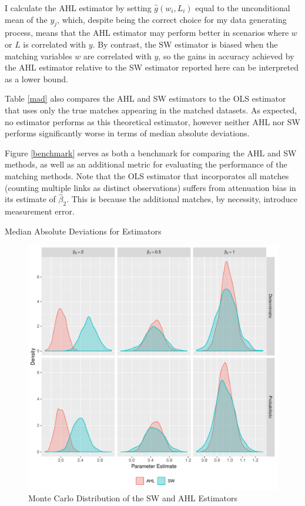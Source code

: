 \documentclass[12pt]{article}
\begin{document}
I calculate the AHL estimator by setting $\hat{g}(w_i, L_i)$ equal to the unconditional mean of the $y_j$, which, despite being the correct choice for my data generating process, means that the AHL estimator may perform better in scenarios where $w$ or $L$ is correlated with $y$.  By contrast, the SW estimator is biased when the matching variables $w$ are correlated with $y$, so the gains in accuracy achieved by the AHL estimator relative to the SW estimator reported here can be interpreted as a lower bound.  

Table \ref{mad} also compares the AHL and SW estimators to the OLS estimator that uses only the true matches appearing in the matched datasets.  As expected, no estimator performs as this theoretical estimator, however neither AHL nor SW performs significantly worse in terms of median absolute deviations. 

Figure \ref{benchmark} serves as both a benchmark for comparing the AHL and SW methods, as well as an additional metric for evaluating the performance of the matching methods.   Note that the OLS estimator that incorporates all matches (counting multiple links as distinct observations) suffers from attenuation bias in its estimate of $\hat{\beta}_2$.  This is because the additional matches, by necessity, introduce measurement error.  

\begin{table}[h!]
\let\center\empty
\let\endcenter\relax
\centering
\caption{Median Absolute Deviations for Estimators}
\vspace{10pt}
\resizebox{0.9\textwidth}{!}{}
\label{mad}
\end{table}

\begin{figure}[htbp]
\label{ahl_sw_fig}
\caption{Monte Carlo Distribution of the SW and AHL Estimators}
\begin{center}
\includegraphics[width=\textwidth]{./Figures/ahl_sw.pdf}
\end{center}
\end{figure}
\end{document}
